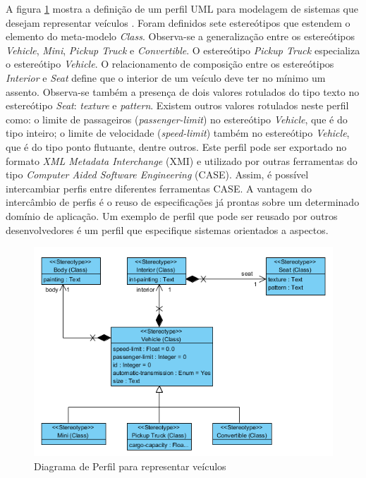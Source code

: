 A figura \ref{fig:profile_diagram} mostra a definição de um perfil UML para modelagem de sistemas que desejam representar veículos
\cite{VisualParadigm11}. Foram definidos sete estereótipos que estendem o elemento do meta-modelo \textit{Class}. Observa-se a generalização entre os
estereótipos \textit{Vehicle}, \textit{Mini}, \textit{Pickup Truck} e \textit{Convertible}. O estereótipo \textit{Pickup Truck} especializa o
estereótipo \textit{Vehicle}. O relacionamento de composição entre os estereótipos \textit{Interior} e \textit{Seat} define que o interior de um
veículo deve ter no mínimo um assento. Observa-se também a presença de dois valores rotulados do tipo texto no estereótipo \textit{Seat}:
\textit{texture} e \textit{pattern}. Existem outros valores rotulados neste perfil como: o limite de passageiros (\textit{passenger-limit}) no
estereótipo \textit{Vehicle}, que é do tipo inteiro; o limite de velocidade (\textit{speed-limit}) também no estereótipo \textit{Vehicle}, que é do
tipo ponto flutuante, dentre outros. Este perfil pode ser exportado no formato \textit{XML Metadata Interchange} (XMI) \cite{xmi:11} 
e utilizado por outras ferramentas do tipo \textit{Computer Aided Software Engineering} (CASE). Assim, 
é possível intercambiar perfis entre diferentes ferramentas CASE. A vantagem do intercâmbio de perfis é o reuso de
especificações já prontas sobre um determinado domínio de aplicação. Um exemplo de perfil que pode ser reusado por outros desenvolvedores é um perfil
que especifique sistemas orientados a aspectos.

\begin{landscape}
\begin{figure}
	\centering
	\includegraphics{img/profile_diagram.png}
	\caption{Diagrama de Perfil para representar veículos}\label{fig:profile_diagram}
\end{figure}
\end{landscape}

